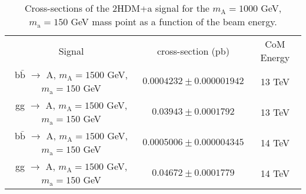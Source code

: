 \begin{table}
    \small
    \centering
    \caption{Cross-sections of the 2HDM+a signal for the $m_\mathrm{A} = 1000$ GeV, $m_\mathrm{a} = 150$ GeV mass point as a function of the beam energy.}
    \begin{tabular}{|c|c|c|}
        \hline
        Signal & cross-section (pb) & CoM Energy \\
        b$\bar{\mathrm{b}}$ $\to$ A, $m_\mathrm{A} = 1500$ GeV, $m_\mathrm{a} = 150$ GeV  &   $0.0004232 \pm 0.000001942$ & 13 TeV \\
        gg $\to$ A, $m_\mathrm{A} = 1500$ GeV, $m_\mathrm{a} = 150$ GeV  &          $0.03943 \pm 0.0001792$ & 13 TeV \\
        b$\bar{\mathrm{b}}$ $\to$ A, $m_\mathrm{A} = 1500$ GeV, $m_\mathrm{a} = 150$ GeV  &   $0.0005006 \pm 0.000004345$ & 14 TeV \\
        gg $\to$ A, $m_\mathrm{A} = 1500$ GeV, $m_\mathrm{a} = 150$ GeV  &          $0.04672 \pm 0.0001779$ & 14 TeV \\
        \hline
    \end{tabular}
    \label{tab:sxsec}
\end{table}
